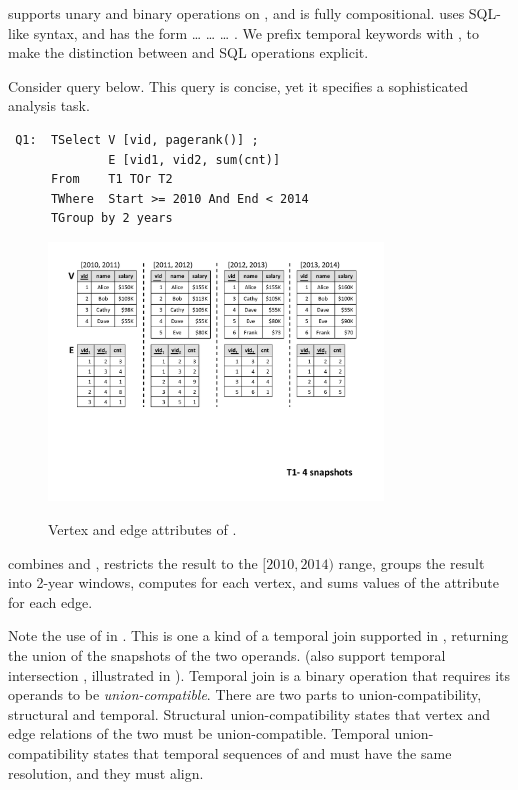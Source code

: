 \ql supports unary and binary operations on \tgs, and is fully
compositional. \ql uses SQL-like syntax, and has the form
 \ldots {} \ldots {} \ldots
{}.  We prefix temporal keywords with , to make
the distinction between \ql and SQL operations explicit. 


Consider query  below.  This query is concise, yet it
specifies a sophisticated analysis task.\\

{\footnotesize
\begin{verbatim}
 Q1:  TSelect V [vid, pagerank()] ; 
              E [vid1, vid2, sum(cnt)] 
      From    T1 TOr T2 
      TWhere  Start >= 2010 And End < 2014 
      TGroup by 2 years
\end{verbatim}
}

\begin{figure}[t!]
  \centering
\includegraphics[width=3.5in]{figs/4snaps_T1_ve.pdf}
  \caption{Vertex and edge attributes of \tg {}.}{}
  \label{fig:tg_t1_ve}
\vspace{-0.5cm}
\end{figure}

 combines \tgs {} and , restricts the
result to the $[2010, 2014)$ range, groups the result into 2-year
  windows, computes  for each vertex, and sums
  values of the attribute  for each edge.

Note the use of  in .  This is one a kind of a
temporal join supported in \ql, returning the union of the snapshots
of the two operands.  (\ql also support temporal intersection
, illustrated in ).  Temporal join is a binary
operation that requires its operands to be {\em union-compatible}.
There are two parts to \tg union-compatibility, structural and
temporal.  Structural union-compatibility states that vertex and edge
relations of the two \tgs must be union-compatible.  Temporal
union-compatibility states that temporal sequences of  and
 must have the same resolution, and they must align. 

